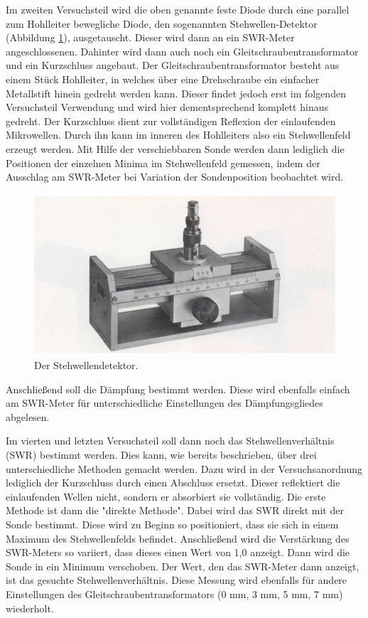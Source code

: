 Im zweiten Versuchsteil wird die oben genannte feste Diode durch eine parallel
zum Hohlleiter bewegliche Diode, den sogenannten Stehwellen-Detektor (Abbildung \ref{fig:stehwellendetektor}), ausgetauscht. Dieser wird dann an ein SWR-Meter angeschlossenen.
Dahinter wird dann auch noch ein Gleitschraubentransformator und ein Kurzschluss angebaut.
Der Gleitschraubentransformator besteht aus einem Stück Hohlleiter, in welches über eine Drehschraube ein einfacher
Metallstift hinein gedreht werden kann. Dieser findet jedoch erst im folgenden Versuchsteil
Verwendung und wird hier dementsprechend komplett hinaus gedreht. Der Kurzschluss
dient zur vollständigen Reflexion der einlaufenden Mikrowellen. Durch ihn kann
im inneren des Hohlleiters also ein Stehwellenfeld erzeugt werden. Mit Hilfe der
verschiebbaren Sonde werden dann lediglich die Positionen der einzelnen Minima
im Stehwellenfeld gemessen, indem der Ausschlag am SWR-Meter bei Variation der
Sondenposition beobachtet wird.

\begin{figure}[H]
  \centering
  \includegraphics[height=6cm]{Stehwellendetektor.PNG}
  \caption{Der Stehwellendetektor. \cite{sample1}}
  \label{fig:stehwellendetektor}
\end{figure}

Anschließend soll die Dämpfung bestimmt werden. Diese wird ebenfalls einfach am
SWR-Meter für unterschiedliche Einstellungen des Dämpfungsgliedes abgelesen.

Im vierten und letzten Versuchsteil soll dann noch das Stehwellenverhältnis (SWR) bestimmt werden.
Dies kann, wie bereits beschrieben, über drei unterschiedliche Methoden gemacht werden.
Dazu wird in der Versuchsanordnung lediglich der Kurzschluss durch einen Abschluss ersetzt.
Dieser reflektiert die einlaufenden Wellen nicht, sondern er absorbiert sie vollständig.
Die erste Methode ist dann die "direkte Methode". Dabei wird das SWR direkt mit der
Sonde bestimmt. Diese wird zu Beginn so positioniert, dass sie sich in einem
Maximum des Stehwellenfelds befindet. Anschließend wird die Verstärkung des SWR-Meters
so variiert, dass dieses einen Wert von 1,0 anzeigt. Dann wird die Sonde in ein Minimum
verschoben. Der Wert, den das SWR-Meter dann anzeigt, ist das gesuchte Stehwellenverhältnis.
Diese Messung wird ebenfalls für andere Einstellungen des Gleitschraubentransformators
(0 mm, 3 mm, 5 mm, 7 mm) wiederholt.

